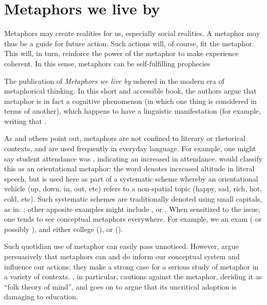 \section{Metaphors we live by}

\setlength{\epigraphwidth}{.7\textwidth} %
\begin{singlespace}
\epigraph{Metaphors may create realities for us, especially social
  realities.  A metaphor may thus be a guide for future action. Such
  actions will, of course, fit the metaphor.  This will, in turn,
  reinforce the power of the metaphor to make experience coherent.  In
  this sense, metaphors can be self-fulfilling
  prophecies}{}\end{singlespace}

The publication of \emph{Metaphors we live by} \parencite{lakoff1980}
ushered in the modern era of metaphorical thinking.  In this short and
accessible book, the authors argue that metaphor is in fact a
cognitive phenomenon (in which one thing is considered in terms of
another), which happens to have a linguistic manifestation (for
example, writing that .

As  and others point out, metaphors are not confined
to literary or rhetorical contexts, and are used frequently in
everyday language.  For example, one might say student attendance was
, indicating an increased in attendance.
 would classify this as an orientational metaphor:
the word  denotes increased altitude in literal speech,
but is used here as part of a systematic scheme whereby an
orientational vehicle (up, down, in, out, etc) refers to a
non-spatial topic (happy, sad, rich, hot, cold, etc).  Such systematic
schemes are traditionally denoted using small capitals, as in:
; other apposite examples might
include , or .  When sensitized to the issue, one tends to see
conceptual metaphors everywhere.  For example, we  an
exam ( or possibly ), and either  college
(), or 
().

Such quotidian use of metaphor can easily pass unnoticed. However,
 argue persuasively that metaphors can and do inform
our conceptual system and influence our actions; they make a strong
case for a serious study of metaphor in a variety of contexts.
, in particular, cautions against the  metaphor, deriding it as ``folk theory of mind'',
and goes on to argue that its uncritical adoption is damaging to
education.

